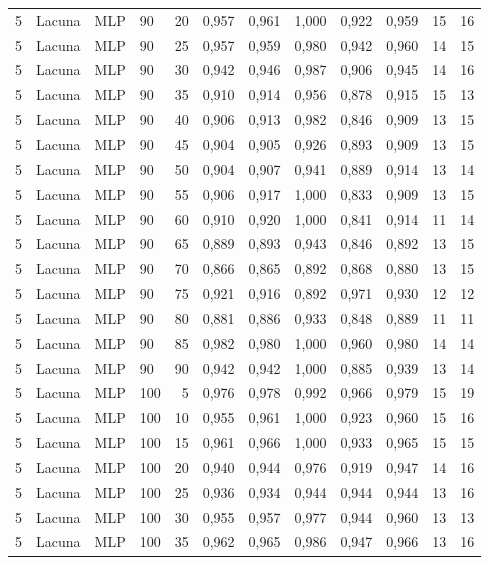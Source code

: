 \begin{longtable}{ccclrrrrrrrr}
5 & Lacuna & MLP & 90 & 20 & 0,957 & 0,961 & 1,000 & 0,922 & 0,959 & 15 & 16 \\
5 & Lacuna & MLP & 90 & 25 & 0,957 & 0,959 & 0,980 & 0,942 & 0,960 & 14 & 15 \\
5 & Lacuna & MLP & 90 & 30 & 0,942 & 0,946 & 0,987 & 0,906 & 0,945 & 14 & 16 \\
5 & Lacuna & MLP & 90 & 35 & 0,910 & 0,914 & 0,956 & 0,878 & 0,915 & 15 & 13 \\
5 & Lacuna & MLP & 90 & 40 & 0,906 & 0,913 & 0,982 & 0,846 & 0,909 & 13 & 15 \\
5 & Lacuna & MLP & 90 & 45 & 0,904 & 0,905 & 0,926 & 0,893 & 0,909 & 13 & 15 \\
5 & Lacuna & MLP & 90 & 50 & 0,904 & 0,907 & 0,941 & 0,889 & 0,914 & 13 & 14 \\
5 & Lacuna & MLP & 90 & 55 & 0,906 & 0,917 & 1,000 & 0,833 & 0,909 & 13 & 15 \\
5 & Lacuna & MLP & 90 & 60 & 0,910 & 0,920 & 1,000 & 0,841 & 0,914 & 11 & 14 \\
5 & Lacuna & MLP & 90 & 65 & 0,889 & 0,893 & 0,943 & 0,846 & 0,892 & 13 & 15 \\
5 & Lacuna & MLP & 90 & 70 & 0,866 & 0,865 & 0,892 & 0,868 & 0,880 & 13 & 15 \\
5 & Lacuna & MLP & 90 & 75 & 0,921 & 0,916 & 0,892 & 0,971 & 0,930 & 12 & 12 \\
5 & Lacuna & MLP & 90 & 80 & 0,881 & 0,886 & 0,933 & 0,848 & 0,889 & 11 & 11 \\
5 & Lacuna & MLP & 90 & 85 & 0,982 & 0,980 & 1,000 & 0,960 & 0,980 & 14 & 14 \\
5 & Lacuna & MLP & 90 & 90 & 0,942 & 0,942 & 1,000 & 0,885 & 0,939 & 13 & 14 \\
5 & Lacuna & MLP & 100 & 5 & 0,976 & 0,978 & 0,992 & 0,966 & 0,979 & 15 & 19 \\
5 & Lacuna & MLP & 100 & 10 & 0,955 & 0,961 & 1,000 & 0,923 & 0,960 & 15 & 16 \\
5 & Lacuna & MLP & 100 & 15 & 0,961 & 0,966 & 1,000 & 0,933 & 0,965 & 15 & 15 \\
5 & Lacuna & MLP & 100 & 20 & 0,940 & 0,944 & 0,976 & 0,919 & 0,947 & 14 & 16 \\
5 & Lacuna & MLP & 100 & 25 & 0,936 & 0,934 & 0,944 & 0,944 & 0,944 & 13 & 16 \\
5 & Lacuna & MLP & 100 & 30 & 0,955 & 0,957 & 0,977 & 0,944 & 0,960 & 13 & 13 \\
5 & Lacuna & MLP & 100 & 35 & 0,962 & 0,965 & 0,986 & 0,947 & 0,966 & 13 & 16 \\

\end{longtable}
